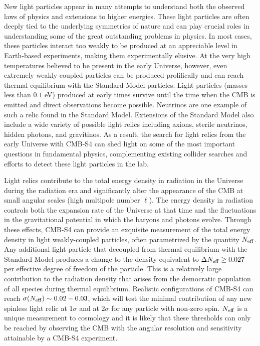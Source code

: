New light particles appear in many attempts to understand both the observed laws of physics and extensions to higher energies.  These light particles are often deeply tied to the underlying symmetries of nature and can play crucial roles in understanding some of the great outstanding problems in physics.  In most cases, these particles interact too weakly to be produced at an appreciable level in Earth-based experiments, making them experimentally elusive.  At the very high temperatures believed to be present in the early Universe, however, even extremely weakly coupled particles can be produced prolifically and can reach thermal equilibrium with the Standard Model particles. Light particles (masses less than $0.1$ eV) produced at early times survive until the time when the CMB is emitted and direct observations become possible.  Neutrinos are one example of such a relic found in the Standard Model.  Extensions of the Standard Model also include a wide variety of possible light relics including axions, sterile neutrinos, hidden photons, and gravitinos.  As a result, the search for light relics from the early Universe with CMB-S4 can shed light on some of the most important questions in fundamental physics, complementing existing collider searches and efforts to detect these light particles in the lab.  
 
Light relics contribute to the total energy density in radiation in the Universe during the radiation era and significantly alter the appearance of the CMB at small angular scales (high multipole number $\ell$). The energy density in radiation controls both the expansion rate of the Universe at that time and the fluctuations in the gravitational potential in which the baryons and photons evolve.  Through these effects, CMB-S4 can provide an exquisite measurement of the total energy density in light weakly-coupled particles, often parametrized by the quantity $N_{\rm eff}$.  Any additional light particle that decoupled from thermal equilibrium with the Standard Model produces a change to the density equivalent to $\Delta N_{\rm eff} \geq 0.027$ per effective degree of freedom of the particle.  This is a relatively large contribution to the radiation density that arises from the democratic population of all species during thermal equilibrium.  Realistic configurations of CMB-S4 can reach $\sigma(N_{\rm eff}) \sim 0.02-0.03$, which will test the minimal contribution of any new spinless light relic at $1\sigma$ and at 2$\sigma$ for any particle with non-zero spin.  $N_{\rm eff}$ is a unique measurement to cosmology and it is likely that these thresholds can only be reached by observing the CMB with the angular resolution and sensitivity attainable by a CMB-S4 experiment.   

